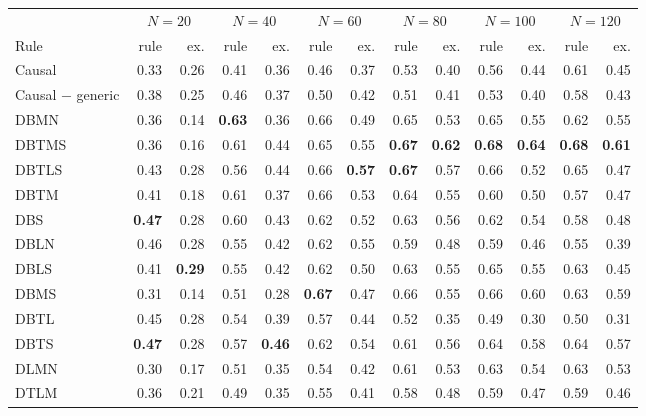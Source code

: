 \begin{tabular}{@{}lrrrrrrrrrrrr@{}}
\toprule
 & \multicolumn{2}{c}{$N=20$} & \multicolumn{2}{c}{$N=40$} & \multicolumn{2}{c}{$N=60$} & \multicolumn{2}{c}{$N=80$} & \multicolumn{2}{c}{$N=100$} & \multicolumn{2}{c}{$N=120$} \\
\cmidrule(lr){2-3}\cmidrule(lr){4-5}\cmidrule(lr){6-7}\cmidrule(lr){8-9}\cmidrule(lr){10-11}\cmidrule(lr){12-13}
Rule & rule & ex. & rule & ex. & rule & ex. & rule & ex. & rule & ex. & rule & ex. \\
\midrule
Causal & 0.33 & 0.26 & 0.41 & 0.36 & 0.46 & 0.37 & 0.53 & 0.40 & 0.56 & 0.44 & 0.61 & 0.45 \\
Causal $-$ generic & 0.38 & 0.25 & 0.46 & 0.37 & 0.50 & 0.42 & 0.51 & 0.41 & 0.53 & 0.40 & 0.58 & 0.43 \\
\midrule
DBMN & 0.36 & 0.14 & \textbf{0.63} & 0.36 & 0.66 & 0.49 & 0.65 & 0.53 & 0.65 & 0.55 & 0.62 & 0.55 \\
DBTMS & 0.36 & 0.16 & 0.61 & 0.44 & 0.65 & 0.55 & \textbf{0.67} & \textbf{0.62} & \textbf{0.68} & \textbf{0.64} & \textbf{0.68} & \textbf{0.61} \\
DBTLS & 0.43 & 0.28 & 0.56 & 0.44 & 0.66 & \textbf{0.57} & \textbf{0.67} & 0.57 & 0.66 & 0.52 & 0.65 & 0.47 \\
DBTM & 0.41 & 0.18 & 0.61 & 0.37 & 0.66 & 0.53 & 0.64 & 0.55 & 0.60 & 0.50 & 0.57 & 0.47 \\
DBS & \textbf{0.47} & 0.28 & 0.60 & 0.43 & 0.62 & 0.52 & 0.63 & 0.56 & 0.62 & 0.54 & 0.58 & 0.48 \\
DBLN & 0.46 & 0.28 & 0.55 & 0.42 & 0.62 & 0.55 & 0.59 & 0.48 & 0.59 & 0.46 & 0.55 & 0.39 \\
DBLS & 0.41 & \textbf{0.29} & 0.55 & 0.42 & 0.62 & 0.50 & 0.63 & 0.55 & 0.65 & 0.55 & 0.63 & 0.45 \\
DBMS & 0.31 & 0.14 & 0.51 & 0.28 & \textbf{0.67} & 0.47 & 0.66 & 0.55 & 0.66 & 0.60 & 0.63 & 0.59 \\
DBTL & 0.45 & 0.28 & 0.54 & 0.39 & 0.57 & 0.44 & 0.52 & 0.35 & 0.49 & 0.30 & 0.50 & 0.31 \\
DBTS & \textbf{0.47} & 0.28 & 0.57 & \textbf{0.46} & 0.62 & 0.54 & 0.61 & 0.56 & 0.64 & 0.58 & 0.64 & 0.57 \\
DLMN & 0.30 & 0.17 & 0.51 & 0.35 & 0.54 & 0.42 & 0.61 & 0.53 & 0.63 & 0.54 & 0.63 & 0.53 \\
DTLM & 0.36 & 0.21 & 0.49 & 0.35 & 0.55 & 0.41 & 0.58 & 0.48 & 0.59 & 0.47 & 0.59 & 0.46 \\

\end{tabular}
